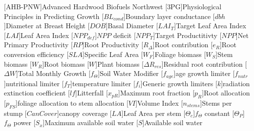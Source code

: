 \usepackage[printonlyused]{acronym}
[AHB-PNW]{Advanced Hardwood Biofuels Northwest}
[\textsc{3PG}]{Physiological Principles in Predicting Growth}
[\ensuremath{BL_{cond}}]{Boundary layer conductance}
[\ensuremath{dbh}]{Diameter at Breast Height}
[\ensuremath{DOB}]{Basal Diameter}
[\ensuremath{LAI_{T}}]{Target Leaf Area Index}
[\ensuremath{LAI}]{Leaf Area Index}
[\ensuremath{NPP_{def}}]{$NPP$ deficit}
[\ensuremath{NPP_{T}}]{Target Productitivty}
[\ensuremath{NPP}]{Net Primary Productivity}
[\ensuremath{RP}]{Root Productivity}
[\ensuremath{R_{\Delta}}]{Root contribution}
[\ensuremath{e_{R}}]{Root conversion efficiency}
[\ensuremath{SLA}]{Specific Leaf Area}
[\ensuremath{W_F}]{Foliage biomass}
[\ensuremath{W_S}]{Stem biomass}
[\ensuremath{W_R}]{Root biomass}
[\ensuremath{W}]{Plant biomass}
[\ensuremath{\Delta R_{res}}]{Residual root contribution}
[\ensuremath{\Delta W}]{Total Monthly Growth}
[\ensuremath{f_\Theta}]{Soil Water Modifier}
[\ensuremath{f_{age}}]{age growth limiter}
[\ensuremath{f_{nutr}}]{nutritional limiter}
[\ensuremath{f_T}]{temperature limiter}
[\ensuremath{f_i}]{Generic growth limiters}
[\ensuremath{k}]{radiation extinction coefficient}
[\ensuremath{lf}]{Litterfall}
[\ensuremath{x_{pR}}]{Maximum root fraction}
[\ensuremath{p_R}]{Root allocation}
[\ensuremath{p_{FS}}]{foliage allocation to stem allocation}
[\ensuremath{VI}]{Volume Index}
[\ensuremath{n_{stems}}]{Stems per stump}
[\ensuremath{CanCover}]{canopy coverage}
[\ensuremath{LA}]{Leaf Area per stem}
[\ensuremath{\Theta_{c}}]{$f_\Theta$ constant}
[\ensuremath{\Theta_{P}}]{$f_\Theta$ power}
[\ensuremath{S_x}]{Maximum available soil water}
[\ensuremath{S}]{Available soil water}


